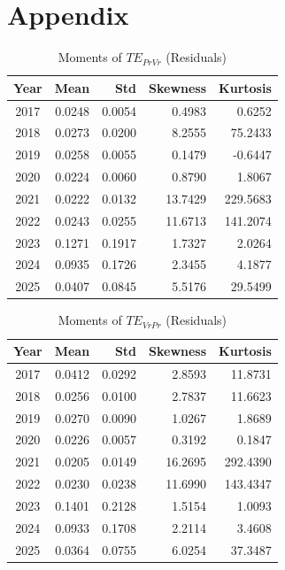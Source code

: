\documentclass{elsarticle}
\def\rightarrow{}%
\begin{document}
\section*{Appendix}

\begin{table}[H]
  \caption{Moments of $TE_{Pr \rightarrow Vr}$ (Residuals)}
  \label{tab:ter_pr2vr_moments_app}
  \centering
  \begin{tabular}{crrrr}
    \hline\noalign{\smallskip}
    \textbf{Year} & \textbf{Mean} & \textbf{Std} & \textbf{Skewness} & \textbf{Kurtosis} \\
    \hline\noalign{\smallskip}
    2017 & 0.0248 & 0.0054 & 0.4983 & 0.6252 \\
    2018 & 0.0273 & 0.0200 & 8.2555 & 75.2433 \\
    2019 & 0.0258 & 0.0055 & 0.1479 & -0.6447 \\
    2020 & 0.0224 & 0.0060 & 0.8790 & 1.8067 \\
    2021 & 0.0222 & 0.0132 & 13.7429 & 229.5683 \\
    2022 & 0.0243 & 0.0255 & 11.6713 & 141.2074 \\
    2023 & 0.1271 & 0.1917 & 1.7327 & 2.0264 \\
    2024 & 0.0935 & 0.1726 & 2.3455 & 4.1877 \\
    2025 & 0.0407 & 0.0845 & 5.5176 & 29.5499 \\
    \hline
  \end{tabular}
\end{table}

\begin{table}[H]
  \caption{Moments of $TE_{Vr \rightarrow Pr}$ (Residuals)}
  \label{tab:ter_vr2pr_moments_app}
  \centering
  \begin{tabular}{crrrr}
    \hline\noalign{\smallskip}
    \textbf{Year} & \textbf{Mean} & \textbf{Std} & \textbf{Skewness} & \textbf{Kurtosis} \\
    \hline\noalign{\smallskip}
    2017 & 0.0412 & 0.0292 & 2.8593 & 11.8731 \\
    2018 & 0.0256 & 0.0100 & 2.7837 & 11.6623 \\
    2019 & 0.0270 & 0.0090 & 1.0267 & 1.8689 \\
    2020 & 0.0226 & 0.0057 & 0.3192 & 0.1847 \\
    2021 & 0.0205 & 0.0149 & 16.2695 & 292.4390 \\
    2022 & 0.0230 & 0.0238 & 11.6990 & 143.4347 \\
    2023 & 0.1401 & 0.2128 & 1.5154 & 1.0093 \\
    2024 & 0.0933 & 0.1708 & 2.2114 & 3.4608 \\
    2025 & 0.0364 & 0.0755 & 6.0254 & 37.3487 \\
    \hline
  \end{tabular}
\end{table}
\end{document}
